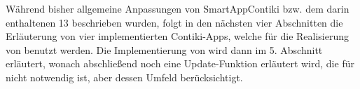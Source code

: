 Während bisher allgemeine Anpassungen von SmartAppContiki bzw. dem darin enthaltenen  13 beschrieben wurden, folgt in den nächsten vier Abschnitten
die Erläuterung von vier implementierten Contiki-Apps, welche für die Realisierung von  benutzt werden. Die Implementierung von  wird dann
im 5. Abschnitt erläutert, wonach abschließend noch eine Update-Funktion erläutert wird, die für  nicht notwendig ist, aber dessen Umfeld berücksichtigt.






